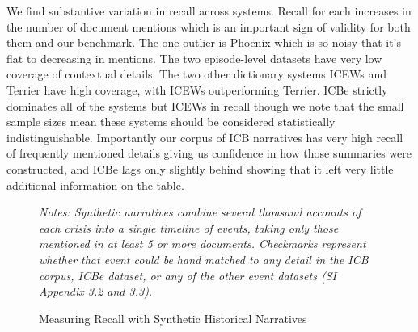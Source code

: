 \documentclass{article}
\begin{document}
We find substantive variation in recall across systems. Recall for each
increases in the number of document mentions which is an important sign
of validity for both them and our benchmark. The one outlier is Phoenix
which is so noisy that it's flat to decreasing in mentions. The two
episode-level datasets have very low coverage of contextual details. The
two other dictionary systems ICEWs and Terrier have high coverage, with
ICEWs outperforming Terrier. ICBe strictly dominates all of the systems
but ICEWs in recall though we note that the small sample sizes mean
these systems should be considered statistically indistinguishable.
Importantly our corpus of ICB narratives has very high recall of
frequently mentioned details giving us confidence in how those summaries
were constructed, and ICBe lags only slightly behind showing that it
left very little additional information on the table.

\clearpage

\begin{figure}[H]
\caption{Measuring Recall with Synthetic Historical Narratives \label{fig:case_study_cuban_recall}}
\textit{Notes: Synthetic narratives combine several thousand accounts of each crisis into a single timeline of events, taking only those mentioned in at least 5 or more documents. Checkmarks represent whether that event could be hand matched to any detail in the ICB corpus, ICBe dataset, or any of the other event datasets (SI Appendix 3.2 and 3.3).}
\end{figure}
\clearpage
\end{document}
